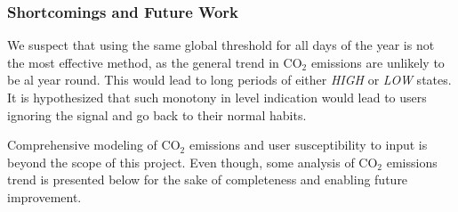 \documentclass[Main]{subfiles}
\begin{document}
	\subsubsection{Shortcomings and Future Work} %
	\label{sub:shortcomings_and_future_work}
		We suspect that using the same global threshold for all days of the year is not the most effective method, as the general trend in CO$_2$ emissions are unlikely to be al year round.
		This would lead to long periods of either \emph{HIGH} or \emph{LOW} states.
		It is hypothesized that such monotony in level indication would lead to users ignoring the signal and go back to their normal habits.

		Comprehensive modeling of CO$_2$ emissions and user susceptibility to input is beyond the scope of this project.
		Even though, some analysis of CO$_2$ emissions trend is presented below for the sake of completeness and enabling future improvement.

		

		
	

		
\end{document}
